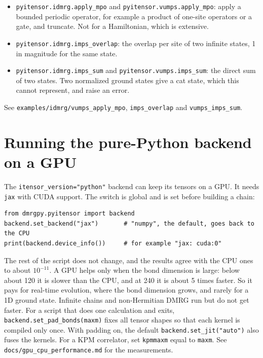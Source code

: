 \documentclass[11pt]{article}
\providecommand{\tightlist}{\setlength{\itemsep}{0pt}\setlength{\parskip}{0pt}}
\begin{document}
\begin{itemize}
\tightlist
\item
  \texttt{pyitensor.\allowbreak{}idmrg.\allowbreak{}apply\_\allowbreak{}mpo} and \texttt{pyitensor.\allowbreak{}vumps.\allowbreak{}apply\_\allowbreak{}mpo}: apply a
  bounded periodic operator, for example a product of one-site operators
  or a gate, and truncate. Not for a Hamiltonian, which is extensive.
\item
  \texttt{pyitensor.\allowbreak{}idmrg.\allowbreak{}imps\_\allowbreak{}overlap}: the overlap per site of two infinite
  states, 1 in magnitude for the same state.
\item
  \texttt{pyitensor.\allowbreak{}idmrg.\allowbreak{}imps\_\allowbreak{}sum} and \texttt{pyitensor.\allowbreak{}vumps.\allowbreak{}imps\_\allowbreak{}sum}: the direct
  sum of two states. Two normalized ground states give a cat state, which
  this cannot represent, and raise an error.
\end{itemize}

See \texttt{examples/idmrg/vumps\_\allowbreak{}apply\_\allowbreak{}mpo}, \texttt{imps\_\allowbreak{}overlap} and \texttt{vumps\_\allowbreak{}imps\_\allowbreak{}sum}.

\section{Running the pure-Python backend on a GPU}

The \texttt{itensor\_\allowbreak{}version="python"} backend can keep its tensors on a GPU. It
needs \texttt{jax} with CUDA support. The switch is global and is set before
building a chain:

\begin{lstlisting}
from dmrgpy.pyitensor import backend
backend.set_backend("jax")       # "numpy", the default, goes back to the CPU
print(backend.device_info())     # for example "jax: cuda:0"
\end{lstlisting}

The rest of the script does not change, and the results agree with the
CPU ones to about \(10^{-11}\). A GPU helps only when the bond dimension is
large: below about 120 it is slower than the CPU, and at 240 it is about
5 times faster. So it pays for real-time evolution, where the bond
dimension grows, and rarely for a 1D ground state. Infinite chains and
non-Hermitian DMRG run but do not get faster. For a script that does one
calculation and exits, \texttt{backend.\allowbreak{}set\_\allowbreak{}pad\_\allowbreak{}bonds(maxm)} fixes all tensor
shapes so that each kernel is compiled only once. With padding on, the
default \texttt{backend.\allowbreak{}set\_\allowbreak{}jit("auto")} also fuses the kernels. For a KPM
correlator,
set \texttt{kpmmaxm} equal to \texttt{maxm}. See \texttt{docs/gpu\_\allowbreak{}cpu\_\allowbreak{}performance.\allowbreak{}md} for the
measurements.
\end{document}
